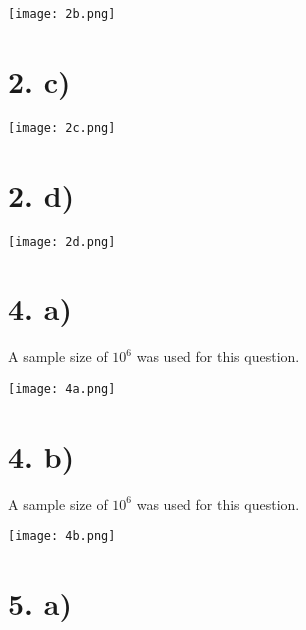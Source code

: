 \documentclass{article}
\begin{document}
\begin{center}
    \texttt{[image: 2b.png]}
\end{center}

\section*{2. c)}

\begin{center}
    \texttt{[image: 2c.png]}
\end{center}

\section*{2. d)}

\begin{center}
    \texttt{[image: 2d.png]}
\end{center}

\section*{4. a)}

A sample size of $10^6$ was used for this question.
\begin{center}
    \texttt{[image: 4a.png]}
\end{center}

\section*{4. b)}

A sample size of $10^6$ was used for this question.
\begin{center}
    \texttt{[image: 4b.png]}
\end{center}

\section*{5. a)}
\end{document}

